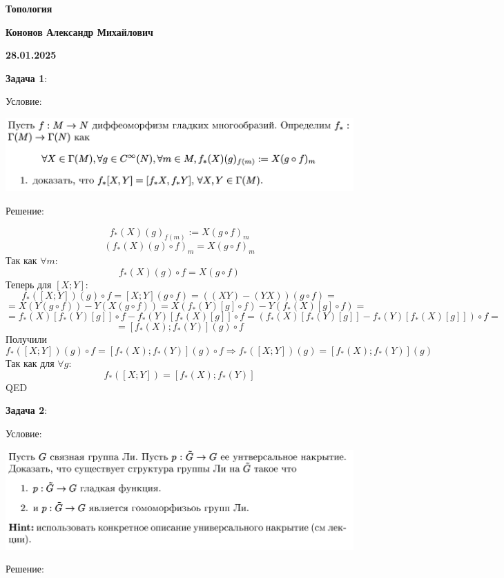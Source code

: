 \documentclass[12pt]{article}
\begin{document}
\begin{large}
\begin{center}
\LARGE \textbf{Топология}
\par
\LARGE \textbf{Кононов Александр Михайлович}
\par
    \textbf{28.01.2025}
\end{center}
\par \textbf{Задача 1}:
\par Условие:
\par
\includegraphics[width=1\textwidth]{photo_1.png}
\par Решение:
\par
\par
\[
    f_*(X)(g)_{f(m)} := X(g \circ f)_m
\]
\[
    (f_*(X)(g) \circ f )_{m} = X(g \circ f)_m
\]
Так как $\forall m$:
\[
    f_*(X)(g)\circ f = X(g \circ f)
\]
Теперь для $[X; Y]$:
\[
    f_*([X; Y])(g)\circ f = [X; Y](g \circ f) = ((XY) - (YX))(g \circ f) =
\]
\[
    = X(Y(g \circ f)) - Y(X(g \circ f)) = X(f_*(Y)[g] \circ f) - Y(f_*(X)[g] \circ f) =
\]
\[
    = f_*(X)[f_*(Y)[g]] \circ f - f_*(Y)[f_*(X)[g]] \circ f = (f_*(X)[f_*(Y)[g]] - f_*(Y)[f_*(X)[g]]) \circ f =
\]
\[
    = [f_*(X); f_*(Y)](g) \circ f
\]
Получили
\[
    f_*([X; Y])(g)\circ f = [f_*(X); f_*(Y)](g) \circ f \Rightarrow f_*([X; Y])(g) = [f_*(X); f_*(Y)](g)
\]
Так как для $\forall g$:
\[
    f_*([X; Y]) = [f_*(X); f_*(Y)]
\]
QED

\par \textbf{Задача 2}:
\par Условие:
\par
\includegraphics[width=1\textwidth]{photo_2.png}
\par Решение:
\par

\end{large}
\end{document}
